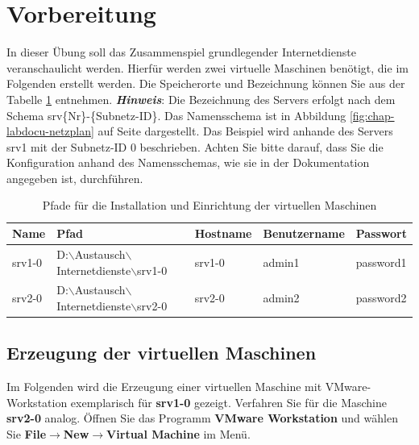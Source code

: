 \section{Vorbereitung}
In dieser Übung soll das Zusammenspiel grundlegender Internetdienste veranschaulicht werden.
Hierfür werden zwei virtuelle Maschinen benötigt, die im Folgenden erstellt
werden. Die Speicherorte und Bezeichnung können Sie aus der Tabelle
\ref{tab:install-location} entnehmen.
\newline
\newline
\textbf{\textit{Hinweis}}: Die Bezeichnung des Servers erfolgt nach dem
Schema srv\{Nr\}-\{Subnetz-ID\}. Das Namensschema
ist in Abbildung \ref{fig:chap-labdocu-netzplan} auf Seite
\pageref{fig:chap-labdocu-netzplan} dargestellt. Das Beispiel wird anhande des
Servers srv1 mit der Subnetz-ID 0 beschrieben. Achten Sie bitte darauf, dass Sie
die Konfiguration anhand des Namensschemas, wie sie in der Dokumentation
angegeben ist, durchführen.

\scriptsize
\begin{table}[!h]
  \centering
	\begin{tabular}{l l l l l}
		\hline
		Name & Pfad & Hostname & Benutzername & Passwort \\
		\hline
		srv1-0 & D:$\backslash$Austausch$\backslash$Internetdienste$\backslash$srv1-0 &
		srv1-0 & admin1 & password1 \\
		srv2-0 & D:$\backslash$Austausch$\backslash$Internetdienste$\backslash$srv2-0 &
		srv2-0 & admin2 & password2 \\
		\hline
	\end{tabular}
	\caption{Pfade für die Installation und Einrichtung der virtuellen Maschinen}
	\label{tab:install-location}
\end{table}
\normalsize 

\subsection{Erzeugung der virtuellen Maschinen}
Im Folgenden wird die Erzeugung einer virtuellen Maschine mit VMware-Workstation
exemplarisch für \textbf{srv1-0} gezeigt. Verfahren Sie für die
Maschine \textbf{srv2-0} analog. Öffnen Sie das Programm  \textbf{VMware
Workstation} und wählen Sie \textbf{File$\rightarrow$New$\rightarrow$Virtual Machine} im Menü.

